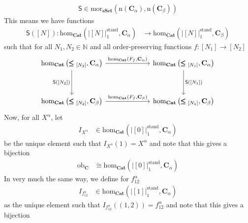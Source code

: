 \begin{prf}
\begin{description}
\begin{align*}
  \mathsf{S}
  \in
  \mathrm{mor}_{\mathbf{sSet}}
  \left(
    \mathrm{n}(\mathbf{C}_{\alpha}),
    \mathrm{n}(\mathbf{C}_{\beta})
  \right)
\end{align*}
This means we have functions
\begin{align*}
  \mathsf{S}([N])
  \colon
  \mathrm{hom}_{\mathbf{Cat}}
  \left(
    \left\vert
      [N]
    \right\vert_{1}^{\textrm{stand}},
    \mathbf{C}_{\alpha}
  \right)
  &\rightarrow
  \mathrm{hom}_{\mathbf{Cat}}
  \left(
    \vert
      [N]
    \vert_{1}^{\textrm{stand}},
    \mathbf{C}_{\beta}
  \right)
\end{align*}
such that for all $N_{1},N_{2} \in \mathbb{N}$ and all order-preserving functions $f \colon [N_{1}] \rightarrow [N_{2}]$
\[
\begin{tikzcd}[row sep=huge, column sep=15ex]
  \mathrm{hom}_{\mathbf{Cat}}
  \left(
    \pmb{\leq}_{[N_{2}]},
    \mathbf{C}_{\alpha}
  \right)
  \arrow{r}{\mathrm{hom}_{\mathbf{Cat}}(F_{f},\mathbf{C}_{\alpha})}
  \arrow[swap]{d}{\mathsf{S}([N_{2}])}
  &
  \mathrm{hom}_{\mathbf{Cat}}
  \left(
    \pmb{\leq}_{[N_{1}]},
    \mathbf{C}_{\alpha}
  \right)
  \arrow{d}{\mathsf{S}([N_{1}])}
  \\
  \mathrm{hom}_{\mathbf{Cat}}
  \left(
    \pmb{\leq}_{[N_{2}]},
    \mathbf{C}_{\beta}
  \right)
  \arrow{r}{\mathrm{hom}_{\mathbf{Cat}}(F_{f},\mathbf{C}_{\beta})}
  &
  \mathrm{hom}_{\mathbf{Cat}}
  \left(
    \pmb{\leq}_{[N_{1}]},
    \mathbf{C}_{\beta}
  \right)
\end{tikzcd}
\]
Now, for all $X^{\alpha}$, let
\begin{align*}
  I_{X^{\alpha}}
  &\in
  \mathrm{hom}_{\mathbf{Cat}}
  \left(
    \left\vert
      [0]
    \right\vert_{1}^{\textrm{stand}},
    \mathbf{C}_{\alpha}
  \right)
\end{align*}
be the unique element such that $I_{X^{\alpha}}(1) = X^{\alpha}$ and note that this gives a bijection
\begin{align*}
  \mathrm{ob}_{\mathbf{C}}
  &\cong
  \mathrm{hom}_{\mathbf{Cat}}
  \left(
    \left\vert
      [0]
    \right\vert_{1}^{\textrm{stand}},
    \mathbf{C}_{\alpha}
  \right)
\end{align*}
In very much the same way, we define for $f_{12}^{\alpha}$
\begin{align*}
  I_{f_{12}^{\alpha}}
  &\in
  \mathrm{hom}_{\mathbf{Cat}}
  \left(
    \left\vert
      [1]
    \right\vert_{1}^{\textrm{stand}},
    \mathbf{C}_{\alpha}
  \right)
\end{align*}
as the unique element such that $I_{f_{12}^{\alpha}}((1,2)) = f_{12}^{\alpha}$ and note that this gives a bijection

\end{description}
\end{prf}
